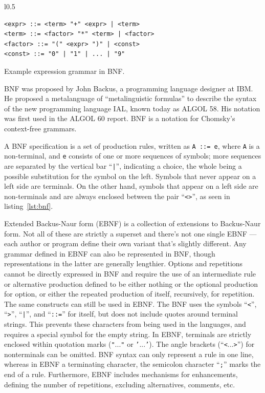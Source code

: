 \documentclass[english,engineering]{wizthesis}
\begin{document}
\begin{wraplisting}{l}{0.5\textwidth}
  \begin{verbatim}
<expr> ::= <term> "+" <expr> | <term>
<term> ::= <factor> "*" <term> | <factor>
<factor> ::= "(" <expr> ")" | <const>
<const> ::= "0" | "1" | ... | "9"
  \end{verbatim}
  \caption{Example expression grammar in BNF.}
  \label{lst:bnf}
\end{wraplisting}

BNF was proposed by John Backus, a programming language designer at IBM. He
proposed a metalanguage of ``metalinguistic formulas'' to describe the syntax of
the new programming language IAL, known today as ALGOL 58. His notation was
first used in the ALGOL 60 report. BNF is a notation for Chomsky's context-free
grammars.

A BNF specification is a set of production rules, written as \texttt{A ::= e},
where \texttt{A} is a non-terminal, and \texttt{e} consists of one or more
sequences of symbols; more sequences are separated by the vertical bar
``\texttt{|}'', indicating a choice, the whole being a possible substitution for
the symbol on the left. Symbols that never appear on a left side are terminals.
On the other hand, symbols that appear on a left side are non-terminals and are
always enclosed between the pair ``\texttt{<>}'', as seen in
listing~\ref{lst:bnf}.

Extended Backus-Naur form (EBNF) is a collection of extensions to Backus-Naur
form. Not all of these are strictly a superset and there's not one single EBNF
--- each author or program define their own variant that's slightly different.
Any grammar defined in EBNF can also be represented in BNF, though
representations in the latter are generally lengthier. Options and repetitions
cannot be directly expressed in BNF and require the use of an intermediate rule
or alternative production defined to be either nothing or the optional
production for option, or either the repeated production of itself, recursively,
for repetition. The same constructs can still be used in EBNF. The BNF uses the
symbols ``\texttt{<}'', ``\texttt{>}'', ``\texttt{|}'', and ``\texttt{::=}'' for
itself, but does not include quotes around terminal strings. This prevents these
characters from being used in the languages, and requires a special symbol for
the empty string. In EBNF, terminals are strictly enclosed within quotation
marks (\texttt{"}...\texttt{"} or \texttt{'}...\texttt{'}). The angle brackets
(``\texttt{<}...\texttt{>}'') for nonterminals can be omitted. BNF syntax can
only represent a rule in one line, whereas in EBNF a terminating character, the
semicolon character ``\texttt{;}'' marks the end of a rule. Furthermore, EBNF
includes mechanisms for enhancements, defining the number of repetitions,
excluding alternatives, comments, etc.
\end{document}
